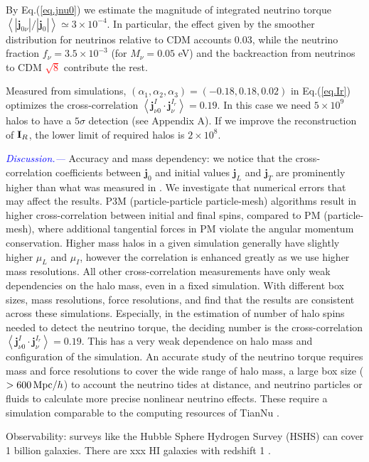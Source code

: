 \documentclass[aps,prd,twocolumn,amsmath,amssymb,amsfont,superscriptaddress]{revtex4-1}
\newcommand{\bs}{\boldsymbol}
\newcommand{\I}{\bold{I}}
\newcommand{\spin}{\bs{j}}
\newcommand{\tcb}{\textcolor{blue}}
\newcommand{\tcr}{\textcolor{red}}
\begin{document}
By Eq.(\ref{eq.jnu0}) we estimate the magnitude of integrated neutrino torque $\left\langle|\spin_{0\nu}|/|\spin_0|\right\rangle\simeq 3\times10^{-4}$. In particular, the effect given by the smoother distribution for neutrinos relative to CDM accounts 0.03, while the neutrino fraction $f_\nu=3.5\times 10^{-3}$ (for $M_\nu=0.05$ eV) and the backreaction from neutrinos to CDM \tcr{$\sqrt{8}$} contribute the rest.

Measured from simulations, $(\alpha_1,\alpha_2,\alpha_3)=(-0.18,0.18,0.02)$ in Eq.(\ref{eq.Ir}) optimizes the cross-correlation $\left\langle\spin^I_{\nu 0}\cdot\spin^{I_r}_\nu\right\rangle=0.19$. In this case we need $5\times 10^9$ halos to have a $5\sigma$ detection (see Appendix A). If we improve the reconstruction of $\I_R$, the lower limit of required halos is $2\times 10^8$.

\tcb{\textit{Discussion.---}} 
Accuracy and mass dependency: we notice that the cross-correlation coefficients between $\spin_0$ and initial values $\spin_L$ and $\spin_T$ are prominently higher than what was measured in \citep{2000ApJ...532L...5L}. We investigate that numerical errors that may affect the results. P3M (particle-particle particle-mesh) algorithms result in higher cross-correlation between initial and final spins, compared to PM (particle-mesh), where additional tangential forces in PM violate the angular momentum conservation. Higher mass halos in a given simulation generally have slightly higher $\mu_L$ and $\mu_I$, however the correlation is enhanced greatly as we use higher mass resolutions. All other cross-correlation measurements have only weak dependencies on the halo mass, even in a fixed simulation. With different box sizes, mass resolutions, force resolutions, and find that the results are consistent across these simulations. Especially, in the estimation of number of halo spins needed to detect the neutrino torque, the deciding number is the cross-correlation $\left\langle\spin^I_{\nu 0}\cdot\spin^{I_r}_\nu\right\rangle=0.19$. This has a very weak dependence on halo mass and configuration of the simulation. An accurate study of the neutrino torque requires mass and force resolutions to cover the wide range of halo mass, a large box size ($>600\,{\rm Mpc}/h$) to account the neutrino tides at distance, and neutrino particles or fluids to calculate more precise nonlinear neutrino effects. These require a simulation comparable to the computing resources of TianNu \citep{2017RAA....17...85E}.

Observability: surveys like the Hubble Sphere Hydrogen Survey (HSHS) \citep{2006astro.ph..6104P} can cover 1 billion galaxies. There are xxx HI galaxies with redshift 1 \citep{2004MNRAS.350.1210Z}.
\end{document}
